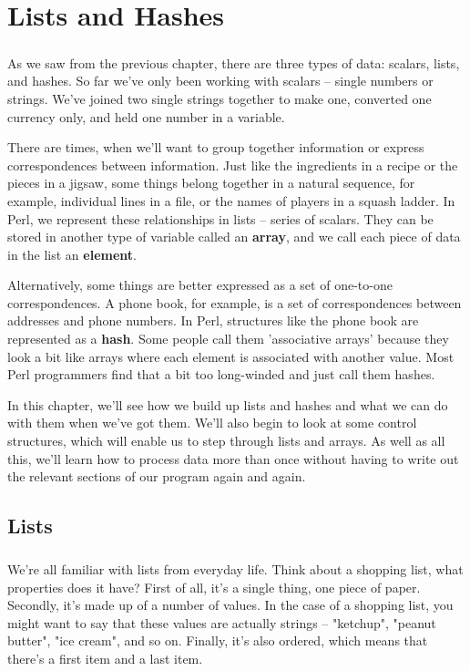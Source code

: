 \documentclass[a4paper,11pt]{book}
\begin{document}

\chapter{Lists and Hashes}
\paragraph{}
As we saw from the previous chapter, there are three types of data: scalars, lists, and hashes. So far we've only been working with scalars -- single numbers or strings. We've joined two single strings together to make one, converted one currency only, and held one number in a variable.

There are times, when we'll want to group together information or express correspondences between information. Just like the ingredients in a recipe or the pieces in a jigsaw, some things belong together in a natural sequence, for example, individual lines in a file, or the names of players in a squash ladder. In Perl, we represent these relationships in lists -- series of scalars. They can be stored in another type of variable called an \textbf{array}, and we call each piece of data in the list an \textbf{element}.

Alternatively, some things are better expressed as a set of one-to-one correspondences. A phone book, for example, is a set of correspondences between addresses and phone numbers. In Perl, structures like the phone book are represented as a \textbf{hash}. Some people call them 'associative arrays' because they look a bit like arrays where each element is associated with another value. Most Perl programmers find that a bit too long-winded and just call them hashes.

In this chapter, we'll see how we build up lists and hashes and what we can do with them when we've got them. We'll also begin to look at some control structures, which will enable us to step through lists and arrays. As well as all this, we'll learn how to process data more than once without having to write out the relevant sections of our program again and again.

\section{Lists}
\paragraph{}
We're all familiar with lists from everyday life. Think about a shopping list, what properties does it have? First of all, it's a single thing, one piece of paper. Secondly, it's made up of a number of values. In the case of a shopping list, you might want to say that these values are actually strings -- "ketchup", "peanut butter", "ice cream", and so on. Finally, it's also ordered, which means that there's a first item and a last item.
\end{document}
